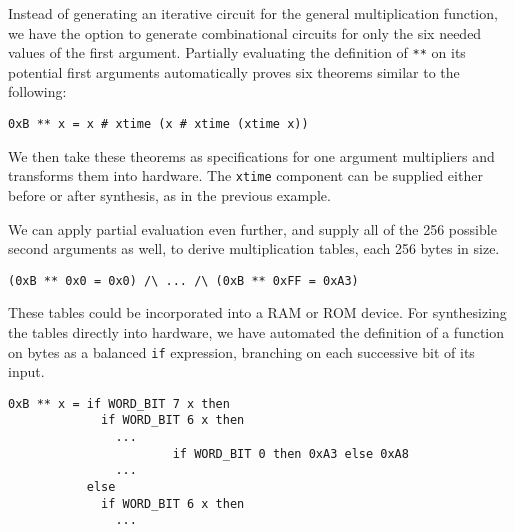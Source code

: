 Instead of generating an iterative circuit for the general multiplication
function, we have the option to generate combinational circuits for only the
six needed values of the first argument.  Partially evaluating the definition
of \verb+**+ on its potential first arguments automatically proves six theorems
similar to the following:
\begin{verbatim}0xB ** x = x # xtime (x # xtime (xtime x))\end{verbatim}
We then take these theorems as specifications for one argument multipliers and
transforms them into hardware.  The \verb+xtime+ component can be supplied
either before or after synthesis, as in the previous example.

We can apply partial evaluation even further, and supply all of the 256
possible second arguments as well, to derive multiplication tables, each 256
bytes in size.
\begin{verbatim}
(0xB ** 0x0 = 0x0) /\ ... /\ (0xB ** 0xFF = 0xA3)
\end{verbatim}
These tables could be incorporated into a RAM or ROM device.  For synthesizing
the tables directly into hardware, we have automated the definition of a
function on bytes as a balanced \verb+if+ expression, branching on each
successive bit of its input.
\begin{verbatim}
0xB ** x = if WORD_BIT 7 x then
             if WORD_BIT 6 x then 
               ...
                       if WORD_BIT 0 then 0xA3 else 0xA8
               ...
           else
             if WORD_BIT 6 x then
               ...
\end{verbatim}

